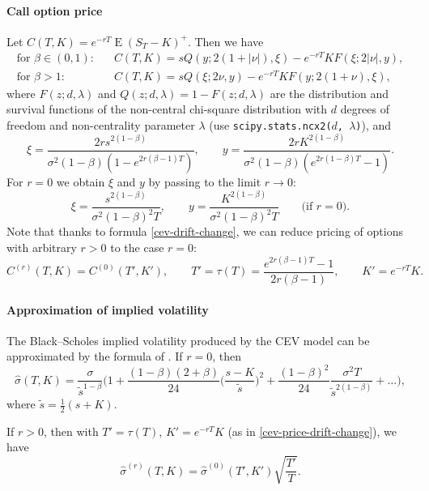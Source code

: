 \documentclass[a4paper,11pt,titlepage]{article}
\DeclareMathOperator{\E}{E}
\renewcommand{\hat}{\widehat}
\renewcommand{\tilde}{\widetilde}
\theoremstyle{remark}
\begin{document}
\paragraph{Call option price}
Let $C(T,K) = e^{-rT}\E(S_T-K)^+$. Then we have
\begin{align*}
\text{for $\beta\in(0,1)$:}&\quad 
  C(T,K) = s Q(y; 2(1+|\nu|), \xi) - e^{-rT}K F(\xi; 2|\nu|, y),\\
\text{for $\beta>1$:}&\quad 
  C(T,K) = s Q(\xi; 2\nu, y) - e^{-rT}K F(y; 2(1+\nu), \xi),
\end{align*}
where $F(z; d,\lambda)$ and $Q(z; d,\lambda) = 1 - F(z;d,\lambda)$ are the distribution and survival functions of the non-central chi-square distribution with $d$ degrees of freedom and non-centrality parameter $\lambda$ (use \texttt{scipy.stats.ncx2($d$,\,$\lambda$)}), and
\[
\xi = \frac{2r s^{2(1-\beta)}}{\sigma^2(1-\beta)(1 - e^{2r(\beta-1)T})},
\qquad
y = \frac{2rK^{2(1-\beta)}}{\sigma^2(1-\beta)(e^{2r(1-\beta)T} - 1)}.
\]
For $r=0$ we obtain $\xi$ and $y$ by passing to the limit $r\to 0$:
\[
\xi = \frac{s^{2(1-\beta)}}{\sigma^2(1-\beta)^2T}, \qquad
y = \frac{K^{2(1-\beta)}}{\sigma^2(1-\beta)^2T} \qquad\text{(if $r=0$)}.
\]
Note that thanks to formula \eqref{cev-drift-change}, we can reduce pricing of options with arbitrary $r>0$ to the case $r=0$:
\begin{equation}
\label{cev-price-drift-change}
C^{(r)}(T,K) = C^{(0)}(T', K'), \qquad 
T' = \tau(T) = \frac{e^{2r(\beta-1)T}-1}{2r(\beta-1)}, \qquad 
K' = e^{-rT} K.
\end{equation}

\paragraph{Approximation of implied volatility}
The Black--Scholes implied volatility produced by the CEV model can be approximated by the formula of \cite{HaganWoodward99}.
If $r=0$, then
\begin{equation}
\label{cev-approximate-iv}
\hat\sigma(T,K) = \frac{\sigma}{\tilde s^{1-\beta}} 
  \biggl(
    1 + \frac{(1-\beta)(2+\beta)}{24} \biggl(\frac{s-K}{\tilde s}\biggr)^2
    + \frac{(1-\beta)^2}{24}\frac{\sigma^2T}{\tilde s^{2(1-\beta)}} + \ldots
  \biggr),
\end{equation}
where $\tilde s = \frac12(s+K)$.

If $r>0$, then with $T' = \tau(T)$, $K' = e^{-rT} K$ (as in \eqref{cev-price-drift-change}), we have
\[
\hat \sigma^{(r)}(T,K) = \hat \sigma^{(0)}(T', K')\sqrt{\frac{T'}T}.
\]
\end{document}
